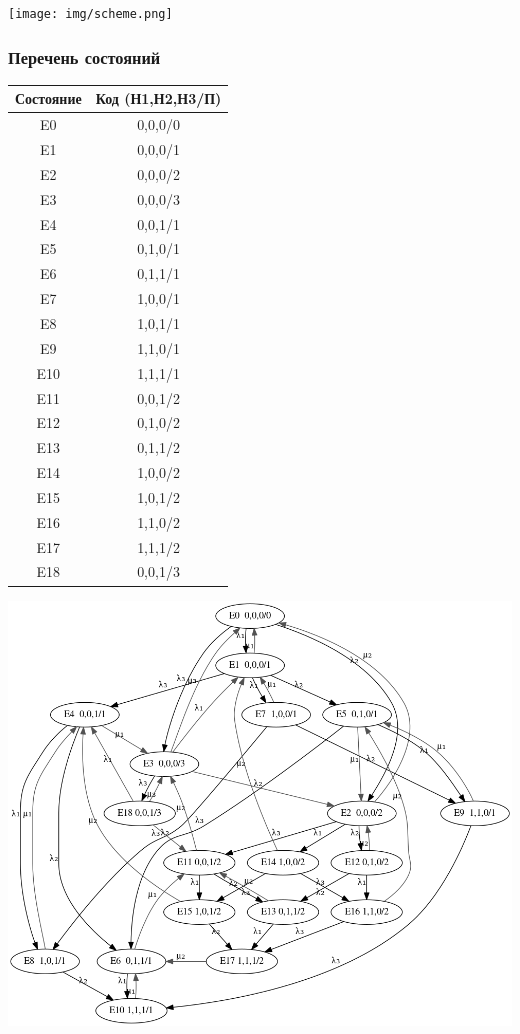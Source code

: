 \texttt{[image: img/scheme.png]}

\subsubsection{Перечень состояний}

\begin{tabular}{|c|c|}
\hline
Состояние & Код (Н1,Н2,Н3/П) \\ \hline
E0  & 0,0,0/0 \\ \hline
E1  & 0,0,0/1 \\ \hline
E2  & 0,0,0/2 \\ \hline
E3  & 0,0,0/3 \\ \hline
E4  & 0,0,1/1 \\ \hline
E5  & 0,1,0/1 \\ \hline
E6  & 0,1,1/1 \\ \hline
E7  & 1,0,0/1 \\ \hline
E8  & 1,0,1/1 \\ \hline
E9  & 1,1,0/1 \\ \hline
E10 & 1,1,1/1 \\ \hline
E11 & 0,0,1/2 \\ \hline
E12 & 0,1,0/2 \\ \hline
E13 & 0,1,1/2 \\ \hline
E14 & 1,0,0/2 \\ \hline
E15 & 1,0,1/2 \\ \hline
E16 & 1,1,0/2 \\ \hline
E17 & 1,1,1/2 \\ \hline
E18 & 0,0,1/3 \\ \hline
\end{tabular}

\includegraphics[width=\textwidth,height=\textheight,keepaspectratio]{img/graph.png}
